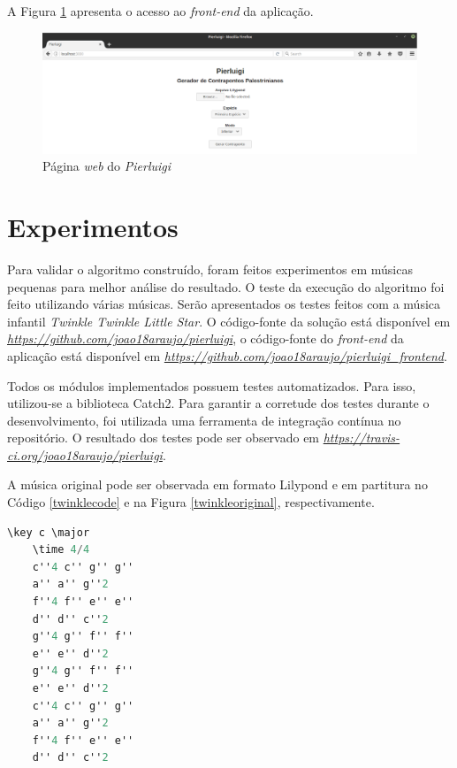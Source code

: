             A Figura \ref{counterpointgenerator} apresenta o acesso ao \textit{front-end} da aplicação.

            \begin{figure}[htb]
              \centering
              \includegraphics[scale=0.45]{figuras/counterpointgenerator.eps}
              \caption{Página \textit{web} do \textit{Pierluigi}}
              \label{counterpointgenerator}
            \end{figure}

  \section[Experimentos]{Experimentos}

    Para validar o algoritmo construído, foram feitos experimentos em músicas pequenas para melhor análise do resultado. O teste da execução do algoritmo foi feito utilizando várias músicas. Serão apresentados os testes feitos com a música infantil \textit{Twinkle Twinkle Little Star}. O código-fonte da solução está disponível em \textit{\url{https://github.com/joao18araujo/pierluigi}}, o código-fonte do \textit{front-end} da aplicação está disponível em \textit{\url{https://github.com/joao18araujo/pierluigi_frontend}}.

    Todos os módulos implementados possuem testes automatizados. Para isso, utilizou-se a biblioteca Catch2. Para garantir a corretude dos testes durante o desenvolvimento, foi utilizada uma ferramenta de integração contínua no repositório. O resultado dos testes pode ser observado em \textit{\url{https://travis-ci.org/joao18araujo/pierluigi}}.

    A música original pode ser observada em formato Lilypond e em partitura no Código \ref{twinklecode} e na Figura \ref{twinkleoriginal}, respectivamente.

    \begin{lstlisting}[language={C}, caption={\textit{Twinkle Twinkle Little Star}}, label={twinklecode}]
    \key c \major
    \time 4/4
    c''4 c'' g'' g''
    a'' a'' g''2
    f''4 f'' e'' e''
    d'' d'' c''2
    g''4 g'' f'' f''
    e'' e'' d''2
    g''4 g'' f'' f''
    e'' e'' d''2
    c''4 c'' g'' g''
    a'' a'' g''2
    f''4 f'' e'' e''
    d'' d'' c''2
    \end{lstlisting}

